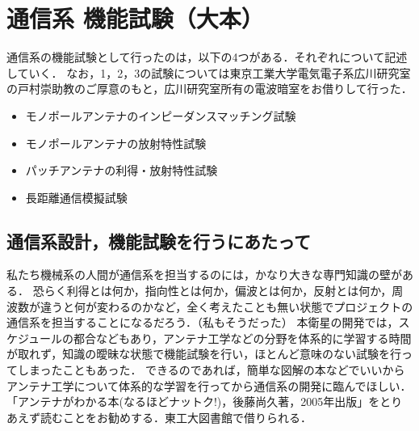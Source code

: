 \section{通信系 機能試験（大本）}
通信系の機能試験として行ったのは，以下の4つがある．それぞれについて記述していく．
なお，1，2，3の試験については東京工業大学電気電子系広川研究室の戸村崇助教のご厚意のもと，広川研究室所有の電波暗室をお借りして行った．
\begin{itemize}
	\item モノポールアンテナのインピーダンスマッチング試験
	\item モノポールアンテナの放射特性試験
	\item パッチアンテナの利得・放射特性試験
	\item 長距離通信模擬試験
\end{itemize}

\subsection{通信系設計，機能試験を行うにあたって}
私たち機械系の人間が通信系を担当するのには，かなり大きな専門知識の壁がある．
恐らく利得とは何か，指向性とは何か，偏波とは何か，反射とは何か，周波数が違うと何が変わるのかなど，全く考えたことも無い状態でプロジェクトの通信系を担当することになるだろう．（私もそうだった）
本衛星の開発では，スケジュールの都合などもあり，アンテナ工学などの分野を体系的に学習する時間が取れず，知識の曖昧な状態で機能試験を行い，ほとんど意味のない試験を行ってしまったこともあった．
できるのであれば，簡単な図解の本などでいいからアンテナ工学について体系的な学習を行ってから通信系の開発に臨んでほしい．
「アンテナがわかる本(なるほどナットク!)，後藤尚久著，2005年出版」をとりあえず読むことをお勧めする．東工大図書館で借りられる．

